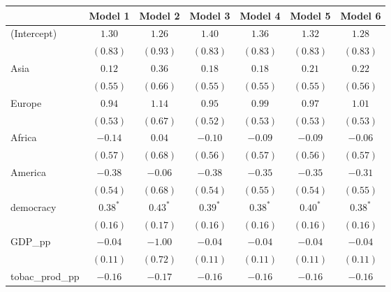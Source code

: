 
\begin{table}[!h]
\begin{center}
\begin{tabular}{l c c c c c c }
\toprule
 & Model 1 & Model 2 & Model 3 & Model 4 & Model 5 & Model 6 \\
\midrule
(Intercept)             & $1.30$       & $1.26$       & $1.40$       & $1.36$       & $1.32$       & $1.28$       \\
                        & $(0.83)$     & $(0.93)$     & $(0.83)$     & $(0.83)$     & $(0.83)$     & $(0.83)$     \\
Asia                    & $0.12$       & $0.36$       & $0.18$       & $0.18$       & $0.21$       & $0.22$       \\
                        & $(0.55)$     & $(0.66)$     & $(0.55)$     & $(0.55)$     & $(0.55)$     & $(0.56)$     \\
Europe                  & $0.94$       & $1.14$       & $0.95$       & $0.99$       & $0.97$       & $1.01$       \\
                        & $(0.53)$     & $(0.67)$     & $(0.52)$     & $(0.53)$     & $(0.53)$     & $(0.53)$     \\
Africa                  & $-0.14$      & $0.04$       & $-0.10$      & $-0.09$      & $-0.09$      & $-0.06$      \\
                        & $(0.57)$     & $(0.68)$     & $(0.56)$     & $(0.57)$     & $(0.56)$     & $(0.57)$     \\
America                 & $-0.38$      & $-0.06$      & $-0.38$      & $-0.35$      & $-0.35$      & $-0.31$      \\
                        & $(0.54)$     & $(0.68)$     & $(0.54)$     & $(0.55)$     & $(0.54)$     & $(0.55)$     \\
democracy               & $0.38^{*}$   & $0.43^{*}$   & $0.39^{*}$   & $0.38^{*}$   & $0.40^{*}$   & $0.38^{*}$   \\
                        & $(0.16)$     & $(0.17)$     & $(0.16)$     & $(0.16)$     & $(0.16)$     & $(0.16)$     \\
GDP\_pp                 & $-0.04$      & $-1.00$      & $-0.04$      & $-0.04$      & $-0.04$      & $-0.04$      \\
                        & $(0.11)$     & $(0.72)$     & $(0.11)$     & $(0.11)$     & $(0.11)$     & $(0.11)$     \\
tobac\_prod\_pp         & $-0.16$      & $-0.17$      & $-0.16$      & $-0.16$      & $-0.16$      & $-0.16$      \\

\end{tabular}
\end{center}
\end{table}
